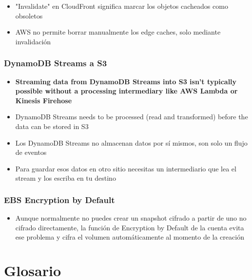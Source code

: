 \documentclass[12pt,a4paper]{report}
\newcommand{\important}[1]{\textcolor{dangerred}{\textbf{#1}}}
\begin{document}
\begin{itemize}
    \item "Invalidate" en CloudFront significa marcar los objetos cacheados como obsoletos
    \item AWS no permite borrar manualmente los edge caches, solo mediante invalidación
\end{itemize}

\subsection{DynamoDB Streams a S3}

\begin{itemize}
    \item \important{Streaming data from DynamoDB Streams into S3 isn't typically possible without a processing intermediary like AWS Lambda or Kinesis Firehose}
    \item DynamoDB Streams needs to be processed (read and transformed) before the data can be stored in S3
    \item Los DynamoDB Streams no almacenan datos por sí mismos, son solo un flujo de eventos
    \item Para guardar esos datos en otro sitio necesitas un intermediario que lea el stream y los escriba en tu destino
\end{itemize}

\subsection{EBS Encryption by Default}

\begin{itemize}
    \item Aunque normalmente no puedes crear un snapshot cifrado a partir de uno no cifrado directamente, la función de Encryption by Default de la cuenta evita ese problema y cifra el volumen automáticamente al momento de la creación
\end{itemize}

\newpage

\chapter{Glosario}
\end{document}
